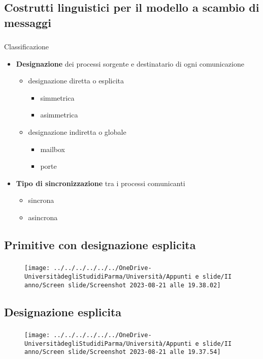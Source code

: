 \documentclass{beamer}
\newenvironment{mainframe}{
	\begin{frame}
		\frametitle{\insertsubsection}
		\framesubtitle{\insertsection}
	}{
	\end{frame}
}
\begin{document}
\subsection{Costrutti linguistici per il modello a scambio di messaggi}
\begin{mainframe}
	Classificazione
	\begin{itemize}
		\item \textbf{Designazione} dei processi sorgente e destinatario di ogni comunicazione
		\begin{itemize}
			\item designazione diretta o esplicita
			\begin{itemize}
				\item simmetrica
				\item asimmetrica
			\end{itemize}
			\item designazione indiretta o globale
			\begin{itemize}
				\item mailbox
				\item porte
			\end{itemize}
		\end{itemize}
		\item \textbf{Tipo di sincronizzazione} tra i processi comunicanti
		\begin{itemize}
			\item sincrona
			\item asincrona
		\end{itemize}
	\end{itemize}
\end{mainframe}
\subsection{Primitive con designazione esplicita}
\begin{mainframe}
	\begin{figure}[h!]
		\centering
		\texttt{[image: ../../../../../../OneDrive-UniversitàdegliStudidiParma/Università/Appunti e slide/II anno/Screen slide/Screenshot 2023-08-21 alle 19.38.02]}
	\end{figure}
\end{mainframe}
\subsection{Designazione esplicita}
\begin{mainframe}
	\begin{figure}[h!]
		\centering
		\texttt{[image: ../../../../../../OneDrive-UniversitàdegliStudidiParma/Università/Appunti e slide/II anno/Screen slide/Screenshot 2023-08-21 alle 19.37.54]}
	\end{figure}
\end{mainframe}
\end{document}
